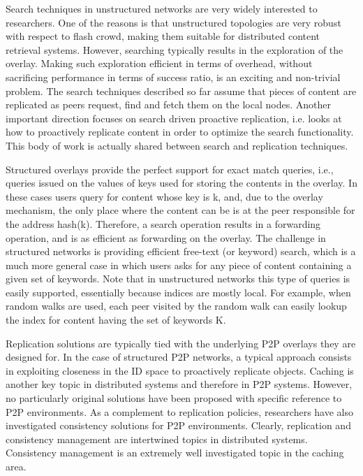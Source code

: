 Search techniques in unstructured networks are very widely interested to researchers. 
One of the reasons is that unstructured topologies are very robust with respect to flash crowd, making them suitable for distributed content retrieval systems. However, searching typically results in the exploration of the overlay. 
Making such exploration efficient in terms of overhead, without sacrificing performance in terms of success ratio, is an exciting and non-trivial problem.
The search techniques described so far assume that pieces of content are replicated as peers request, find and fetch them on the local nodes. 
Another important direction focuses on search driven proactive replication, i.e. looks at how to proactively replicate content in order to optimize the search functionality. 
This body of work is actually shared between search and replication techniques. 

Structured overlays provide the perfect support for exact match queries, i.e., queries issued on the values of keys used for storing the contents in the overlay. 
In these cases users query for content whose key is k, and, due to the overlay mechanism, the only place where the content can be is at the peer responsible for the address hash(k). 
Therefore, a search operation results in a forwarding operation, and is as efficient as forwarding on the overlay.
The challenge in structured networks is providing efficient free-text (or keyword) search, which is a much more general case in which users asks for any piece of content containing a given set of keywords. 
Note that in unstructured networks this type of queries is easily supported, essentially because indices are mostly local. 
For example, when random walks are used, each peer visited by the random walk can easily lookup the index for content having the set of keywords K.

Replication solutions are typically tied with the underlying P2P overlays they are designed for. 
In the case of structured P2P networks, a typical approach consists in exploiting closeness in the ID space to proactively replicate objects. 
Caching is another key topic in distributed systems and therefore in P2P systems. 
However, no particularly original solutions have been proposed with specific reference to P2P environments.
As a complement to replication policies, researchers have also investigated consistency solutions for P2P environments. 
Clearly, replication and consistency management are intertwined topics in distributed systems. 
Consistency management is an extremely well investigated topic in the caching area.

